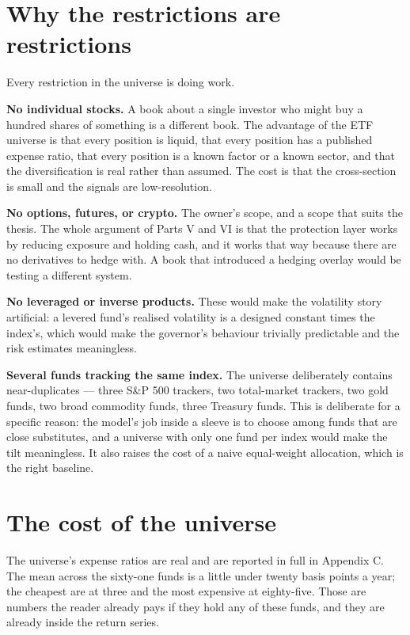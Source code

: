 \section{Why the restrictions are restrictions}

Every restriction in the universe is doing work.

\textbf{No individual stocks.} A book about a single investor who might
buy a hundred shares of something is a different book. The advantage of
the ETF universe is that every position is liquid, that every position has
a published expense ratio, that every position is a known factor or a
known sector, and that the diversification is real rather than assumed.
The cost is that the cross-section is small and the signals are
low-resolution.

\textbf{No options, futures, or crypto.} The owner's scope, and a scope
that suits the thesis. The whole argument of Parts V and VI is that the
protection layer works by reducing exposure and holding cash, and it works
that way because there are no derivatives to hedge with. A book that
introduced a hedging overlay would be testing a different system.

\textbf{No leveraged or inverse products.} These would make the
volatility story artificial: a levered fund's realised volatility is a
designed constant times the index's, which would make the governor's
behaviour trivially predictable and the risk estimates meaningless.

\textbf{Several funds tracking the same index.} The universe deliberately
contains near-duplicates --- three S\&P 500 trackers, two total-market
trackers, two gold funds, two broad commodity funds, three Treasury
funds. This is deliberate for a specific reason: the model's job inside a
sleeve is to choose among funds that are close substitutes, and a universe
with only one fund per index would make the tilt meaningless. It also
raises the cost of a naive equal-weight allocation, which is the right
baseline.

\section{The cost of the universe}

The universe's expense ratios are real and are reported in full in
Appendix C. The mean across the sixty-one funds is a little under twenty
basis points a year; the cheapest are at three and the most expensive at
eighty-five. Those are numbers the reader already pays if they hold any
of these funds, and they are already inside the return series.

